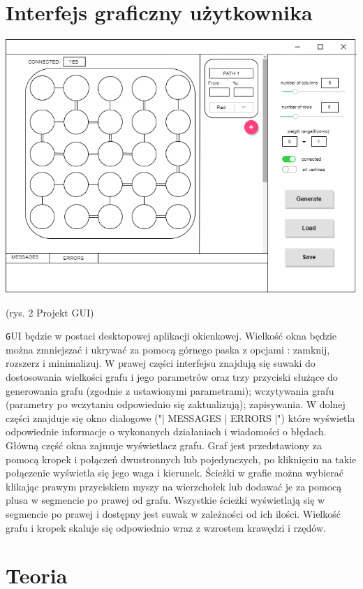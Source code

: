 \documentclass[]{article}
\begin{document}
\section{Interfejs graficzny użytkownika}\label{header-n256}
\includegraphics[scale=0.5]{gui_jimp.drawio}
\begin{center}
(rys. 2 Projekt GUI)
\end{center}
\texttt
GUI będzie w postaci desktopowej aplikacji okienkowej. Wielkość okna będzie można zmniejszać i ukrywać za pomocą górnego paska z opcjami : zamknij, rozszerz i minimalizuj. W prawej części interfejsu znajdują się suwaki do dostosowania wielkości grafu i jego parametrów oraz trzy przyciski służące do generowania grafu (zgodnie z ustawionymi parametrami); wczytywania grafu (parametry po wczytaniu odpowiednio się zaktualizują); zapisywania. W dolnej części znajduje się okno dialogowe ("| MESSAGES | ERRORS |") które wyświetla odpowiednie informacje o wykonanych działaniach i wiadomości o błędach. Główną część okna zajmuje wyświetlacz grafu. Graf jest przedstawiony za pomocą kropek i połączeń dwustronnych lub pojedynczych, po kliknięciu na takie połączenie wyświetla się jego waga i kierunek. Ścieżki w grafie można wybierać klikając prawym przyciskiem myszy na wierzchołek lub dodawać je za pomocą plusa w segmencie po prawej od grafu. Wszystkie ścieżki wyświetlają się w segmencie po prawej i dostępny jest suwak w zależności od ich ilości. Wielkość grafu i kropek skaluje się odpowiednio wraz z wzrostem krawędzi i rzędów.




\section{Teoria}\label{header-n279}
\end{document}
